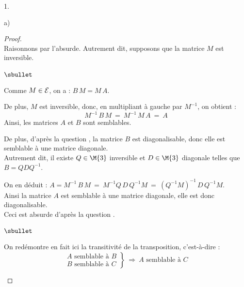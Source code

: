 \begin{noliste}{1.}
\begin{noliste}{a)}
    \begin{proof}~\\
      Raisonnons par l'absurde. Autrement dit, supposons que la 
      matrice $M$ est inversible.
      \begin{noliste}{$\sbullet$}
	\item Comme $M\in {\cal E}$, on a : $B \, M = M \, A$.
	
	\item De plus, $M$ est inversible, donc, en multipliant à 
	gauche par $M^{-1}$, on obtient : 
	\[
	  M^{-1} \, B \, M \ = \ M^{-1} \, M \, A \ = \ A
	\]
	Ainsi, les matrices $A$ et $B$ sont semblables.
	
	
	\newpage
	
	
	\item De plus, d'après la question , la 
	matrice $B$ est diagonalisable, donc elle est semblable à une 
	matrice diagonale.\\
	Autrement dit, il existe $Q \in \M{3}$ inversible et $D \in 
	\M{3}$ diagonale telles que $B=QDQ^{-1}$.
	
	\item On en déduit : $A = M^{-1} \, B \, M \ = \ M^{-1} Q \, D 
	\, Q^{-1} M \ = \ (Q^{-1} M)^{-1} \, D \, Q^{-1} M$.\\
	Ainsi la matrice $A$ est semblable à une matrice diagonale, elle
	est donc diagonalisable.\\
	Ceci est absurde d'après la question .
      \end{noliste}
      
      
      \begin{remark}
        \begin{noliste}{$\sbullet$}
	  \item On redémontre en fait ici la transitivité de la 
	  transposition, c'est-à-dire :
	  \[
	    \left. 
	    \begin{array}{c}
	      \text{$A$ semblable à $B$}\\
	      \text{$B$ semblable à $C$}
	    \end{array}
	    \right\}
	    \ \Rightarrow \
	    \text{$A$ semblable à $C$}
	  \]
	  

\end{noliste}
\end{remark}
\end{proof}
\end{noliste}
\end{noliste}
